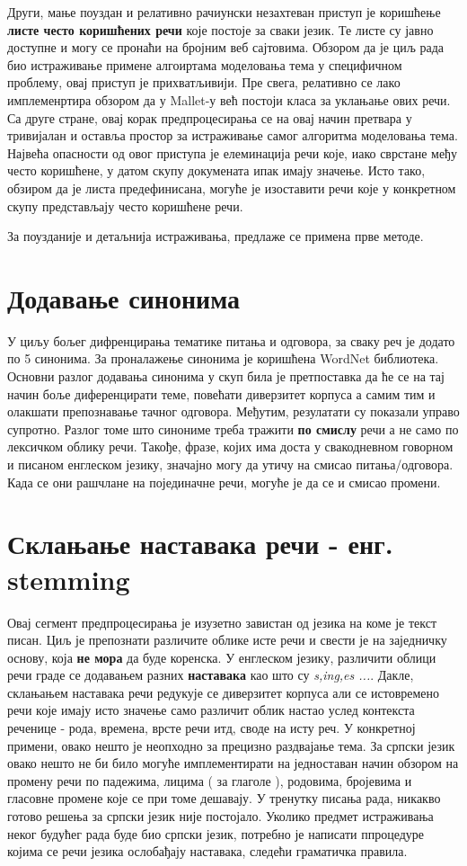 Други, мање поуздан и релативно рачиунски незахтеван приступ је коришћење \textbf{листе често коришћених речи} које постоје за сваки језик. Те листе су јавно доступне и могу се пронаћи на бројним веб сајтовима. Обзором да је циљ рада био истраживање примене алгоиртама моделовања тема у специфичном проблему, овај приступ је прихватљивији. Пре свега, релативно се лако имплеменртира обзором да у Mallet-у већ постоји класа за уклањање ових речи. Са друге стране, овај корак предпроцесирања се на овај начин претвара у тривијалан и оставља простор за истраживање самог алгоритма моделовања тема. 
Највећа опасности од овог приступа је елеминација речи које, иако сврстане међу често коришћене, у датом скупу докумената ипак имају значење. Исто тако, обзиром да је листа предефинисана, могуће је изоставити речи које у конкретном скупу представљају често коришћене речи.

За поузданије и детаљнија истраживања, предлаже се примена прве методе. 
 
 	
	
	\section{Додавање синонима}
У циљу бољег дифренцирања тематике питања и одговора, за сваку реч је додато по 5  синонима. За проналажење синонима је коришћена WordNet библиотека. Основни разлог додавања синонима у скуп била је претпоставка да ће се на тај начин боље диференцирати теме, повећати диверзитет корпуса а самим тим и олакшати препознавање тачног одговора. Међутим, резулатати су показали управо супротно. Разлог томе што синониме треба тражити \textbf{по смислу} речи а не само по лексичком облику речи. Такође, фразе, којих има доста у свакодневном говорном и писаном енглеском језику, значајно могу да утичу на смисао питања/одговора. Када се они рашчлане на појединачне речи, могуће је да се и смисао промени.

	\section{Склањање наставака речи - енг. stemming}
	
Овај сегмент предпроцесирања је изузетно завистан од језика на коме је текст писан. Циљ је препознати различите облике исте речи и свести је на заједничку основу, која \textbf{не мора} да буде коренска. У енглеском језику, различити облици речи граде се додавањем разних \textbf{наставака} као што су \textit{s,ing,es ...}. Дакле, склањањем наставака речи редукује се диверзитет корпуса али се истовремено речи које имају исто значење само различит облик настао услед контекста реченице - рода, времена, врсте речи итд, своде на исту реч. У конкретној примени, овако нешто је неопходно за прецизно раздвајање тема. 
За српски језик овако нешто не би било могуће имплементирати на једноставан начин обзором на промену речи по падежима, лицима ( за глаголе ), родовима, бројевима и гласовне промене које се при томе дешавају. У тренутку писања рада, никакво готово решења за српски језик није постојало. Уколико предмет истраживања неког будућег рада буде био српски језик, потребно је написати ппроцедуре којима се речи језика ослобађају наставака, следећи граматичка правила.


